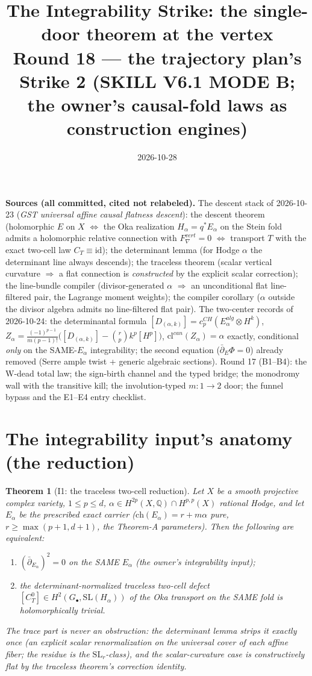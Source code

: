 \documentclass[11pt]{article}
\title{The Integrability Strike: the single-door theorem at the vertex\\
{\large Round 18 --- the trajectory plan's Strike 2 (SKILL V6.1 MODE B; the owner's causal-fold laws as construction engines)}}
\date{2026-10-28}
\newtheorem{theorem}{Theorem}
\begin{document}
\maketitle

\noindent\textbf{Sources (all committed, cited not relabeled).}
The descent stack of 2026-10-23 (\emph{GST universal affine causal flatness descent}):
the descent theorem (holomorphic $E$ on $X$ $\iff$ the Oka realization $H_\alpha=q^*E_\alpha$
on the Stein fold admits a holomorphic relative connection with $F^{vert}_\nabla=0$
$\iff$ transport $T$ with the exact two-cell law $C_T\equiv\mathrm{id}$);
the determinant lemma (for Hodge $\alpha$ the determinant line always descends);
the traceless theorem (scalar vertical curvature $\Rightarrow$ a flat connection is
\emph{constructed} by the explicit scalar correction); the line-bundle compiler
(divisor-generated $\alpha$ $\Rightarrow$ an unconditional flat line-filtered pair,
the Lagrange moment weights); the compiler corollary ($\alpha$ outside the divisor
algebra admits no line-filtered flat pair).
The two-center records of 2026-10-24: the determinantal formula
$[D_{(\alpha,k)}]=c_p^{CH}(E_\alpha^{alg}\otimes H^k)$,
$Z_\alpha=\frac{(-1)^{p-1}}{m(p-1)!}\bigl([D_{(\alpha,k)}]-\binom{r}{p}k^p[H^p]\bigr)$,
$\mathrm{cl}^{can}(Z_\alpha)=\alpha$ exactly, conditional \emph{only} on the SAME-$E_\alpha$
integrability; the second equation ($\bar\partial_E\Phi=0$) already removed
(Serre ample twist + generic algebraic sections).
Round 17 (B1--B4): the W-dead total law; the sign-birth channel and the typed bridge;
the monodromy wall with the transitive kill; the involution-typed $m{:}1\to2$ door;
the funnel bypass and the E1--E4 entry checklist.

\section{The integrability input's anatomy (the reduction)}

\begin{theorem}[I1: the traceless two-cell reduction]\label{thm:i1}
Let $X$ be a smooth projective complex variety, $1\le p\le d$, $\alpha\in H^{2p}(X,\mathbb Q)\cap H^{p,p}(X)$
rational Hodge, and let $E_\alpha$ be the prescribed exact carrier
($\mathrm{ch}(E_\alpha)=r+m\alpha$ pure, $r\ge\max(p+1,d+1)$, the Theorem-A parameters).
Then the following are equivalent:
\begin{enumerate}
\item $(\bar\partial_{E_\alpha})^2=0$ on the SAME $E_\alpha$ (the owner's integrability input);
\item the determinant-normalized traceless two-cell defect
$[C_T^0]\in H^2(G_\bullet,\mathrm{SL}(H_\alpha))$ of the Oka transport on the SAME fold
is holomorphically trivial.
\end{enumerate}
The trace part is never an obstruction: the determinant lemma strips it exactly once
(an explicit scalar renormalization on the universal cover of each affine fiber;
the residue is the $\mathrm{SL}_r$-class), and the scalar-curvature case is
constructively flat by the traceless theorem's correction identity.
\end{theorem}
\end{document}
